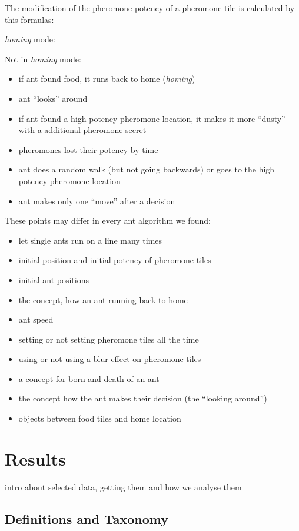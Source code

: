 The modification of the pheromone potency of a pheromone tile is
calculated by this formulas:

\emph{homing} mode:

Not in \emph{homing} mode:

\begin{itemize}
\tightlist
\item
  if ant found food, it runs back to home (\emph{homing})
\item
  ant ``looks'' around
\item
  if ant found a high potency pheromone location, it makes it more
  ``dusty'' with a additional pheromone secret
\item
  pheromones lost their potency by time
\item
  ant does a random walk (but not going backwards) or goes to the high
  potency pheromone location
\item
  ant makes only one ``move'' after a decision
\end{itemize}

These points may differ in every ant algorithm we found:

\begin{itemize}
\tightlist
\item
  let single ants run on a line many times
\item
  initial position and initial potency of pheromone tiles
\item
  initial ant positions
\item
  the concept, how an ant running back to home
\item
  ant speed
\item
  setting or not setting pheromone tiles all the time
\item
  using or not using a blur effect on pheromone tiles
\item
  a concept for born and death of an ant
\item
  the concept how the ant makes their decision (the ``looking around'')
\item
  objects between food tiles and home location
\end{itemize}

\section{Results}\label{results}

intro about selected data, getting them and how we analyse them

\subsection{Definitions and Taxonomy}\label{definitions-and-taxonomy}

